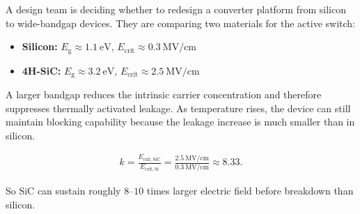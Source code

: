 


A design team is deciding whether to redesign a converter platform from silicon to wide-bandgap devices. They are comparing two materials for the active switch:
\begin{itemize}
    \setlength{\itemsep}{-1pt} %
    \setlength{\parskip}{-1pt} %
    \item \textbf{Silicon:} $E_\mathrm{g} \approx \SI{1.1}{\electronvolt}$, $E_{\mathrm{crit}} \approx \SI{0.3}{\mega\volt\per\centi\metre}$
    \item \textbf{4H-SiC:} $E_\mathrm{g} \approx \SI{3.2}{\electronvolt}$, $E_{\mathrm{crit}} \approx \SI{2.5}{\mega\volt\per\centi\metre}$
\end{itemize}

\begin{solutionblock}
A larger bandgap reduces the intrinsic carrier concentration and therefore suppresses thermally activated leakage. As temperature rises, the device can still maintain blocking capability because the leakage increase is much smaller than in silicon.
\end{solutionblock}

\begin{solutionblock}
    \begin{align*}
        k = \frac{E_{\mathrm{crit,SiC}}}{E_{\mathrm{crit,Si}}} = \frac{\SI{2.5}{\mega\volt\per\centi\metre}}{\SI{0.3}{\mega\volt\per\centi\metre}} \approx 8.33.
    \end{align*}
    
    So SiC can sustain roughly $8$--$10$ times larger electric field before breakdown than silicon.
\end{solutionblock}

